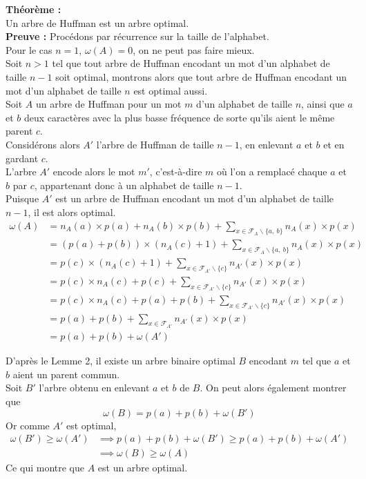 \documentclass[a4paper, 12pt]{article}
\let\qed\square
\begin{document}
\newpage
\textbf{Théorème :} \\
Un arbre de Huffman est un arbre optimal. \\

\textbf{Preuve :}
Procédons par récurrence sur la taille de l'alphabet. \\
Pour le cas $n = 1$, $\omega(A) = 0$, on ne peut pas faire mieux. \\
Soit $n > 1$ tel que tout arbre de Huffman encodant un mot d'un alphabet de taille $n-1$ soit optimal, montrons alors que tout arbre de Huffman encodant un mot d'un alphabet de taille $n$ est optimal aussi. \\
Soit $A$ un arbre de Huffman pour un mot $m$ d'un alphabet de taille $n$, ainsi que $a$ et $b$ deux caractères avec la plus basse fréquence de sorte qu'ils aient le même parent $c$. \\
Considérons alors $A'$ l'arbre de Huffman de taille $n-1$, en enlevant $a$ et $b$ et en gardant $c$. \\
L'arbre $A'$ encode alors le mot $m'$, c'est-à-dire $m$ où l'on a remplacé chaque $a$ et $b$ par $c$, appartenant donc à un alphabet de taille $n-1$. \\
Puisque $A'$ est un arbre de Huffman encodant un mot d'un alphabet de taille $n-1$, il est alors optimal.
\begin{align*}
\omega(A) &= n_A(a)\times p(a) + n_A(b)\times p(b)+\sum_{x\in \mathcal{F}_A\backslash\{a,\ b\}} n_A(x)\times p(x)‎‎ \\
&= (p(a)+p(b))\times(n_A(c)+1)+\sum_{x\in \mathcal{F}_A\backslash\{a,\ b\}} n_A(x)\times p(x)‎‎ \\
&= p(c)\times(n_A(c)+1)+\sum_{x\in \mathcal{F}_{A'}\backslash\{c\}} n_{A'}(x)\times p(x)‎‎ \\
&= p(c)\times n_A(c)+p(c)+\sum_{x\in \mathcal{F}_{A'}\backslash\{c\}} n_{A'}(x)\times p(x)‎‎ \\
&= p(c)\times n_A(c)+p(a)+p(b)+\sum_{x\in \mathcal{F}_{A'}\backslash\{c\}} n_{A'}(x)\times p(x)‎‎ \\
&= p(a)+p(b)+\sum_{x\in \mathcal{F}_{A'}} n_{A'}(x)\times p(x)‎‎ \\
&= p(a)+p(b)+\omega(A')
\end{align*}

D'après le Lemme 2, il existe un arbre binaire optimal $B$ encodant $m$ tel que $a$ et $b$ aient un parent commun. \\ 
Soit $B'$ l'arbre obtenu en enlevant $a$ et $b$ de $B$. On peut alors également montrer que
$$
\omega(B) = p(a)+p(b)+\omega(B')
$$
Or comme $A'$ est optimal,
\begin{align*}
\omega(B') \geq \omega(A') &\implies p(a)+p(b)+\omega(B') \geq p(a)+p(b)+\omega(A') \\
&\implies \omega(B) \geq \omega(A)
\end{align*}
Ce qui montre que $A$ est un arbre optimal. \qed \\
\end{document}
